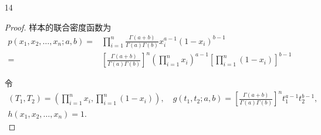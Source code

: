 \documentclass[normal,founder,mtpro2,cn]{elegantnote}
\begin{document}
\begin{enumerate}
\begin{proof}
            令
            \begin{equation*}
                \left(T_{1},T_{2}\right)=\left(X_{(1)},X_{(n)}\right),\quad g\left(t_{1},t_{2};\theta\right)=\frac{1}{\theta^{n}}I_{\{\theta<t_{1}\leq t_{2}<2\theta\}},\quad h\left(x_{1},x_{2},\ldots, x_{n}\right)=1.
            \end{equation*}

            由因子分解定理有，$\left(T_{1},T_{2}\right)=\left(X_{(1)},X_{(n)}\right)$ 为 $\theta$ 的充分统计量。
        \end{proof}
    \item[14]
        \begin{proof}
            样本的联合密度函数为
            \begin{equation*}
                \begin{aligned}
                    p\left(x_{1},x_{2},\ldots,x_{n};a,b\right)= & \prod_{i=1}^{n}\frac{\Gamma(a+b)}{\Gamma(a)\Gamma(b)}x_{i}^{a-1}\left(1-x_{i}\right)^{b-1}                                                           \\
                    =                                           & \left[\frac{\Gamma(a+b)}{\Gamma(a)\Gamma(b)}\right]^{n}\left(\prod_{i=1}^{n}x_{i}\right)^{a-1}\left[\prod_{i=1}^{n}\left(1-x_{i}\right)\right]^{b-1}
                \end{aligned}
            \end{equation*}

            令
            \begin{gather*}
                \left(T_{1},T_{2}\right)=\left(\prod_{i=1}^{n}x_{i},\prod_{i=1}^{n}\left(1-x_{i}\right)\right),\quad g\left(t_{1},t_{2};a,b\right)=\left[\frac{\Gamma(a+b)}{\Gamma(a)\Gamma(b)}\right]^{n}t_{1}^{a-1}t_{2}^{b-1}, \\
                h\left(x_{1},x_{2},\ldots,x_{n}\right)=1.
            \end{gather*}


\end{proof}
\end{enumerate}
\end{document}
